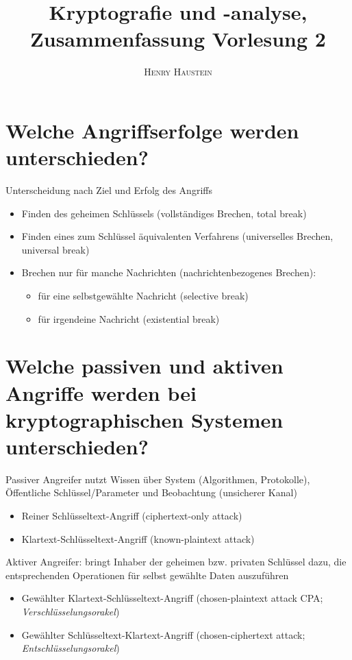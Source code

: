 \documentclass{article}
\title{\textbf{Kryptografie und -analyse, Zusammenfassung Vorlesung 2}}
\author{\textsc{Henry Haustein}}
\date{}
\begin{document}
	\maketitle
	
	\section*{Welche Angriffserfolge werden unterschieden?}
	Unterscheidung nach Ziel und Erfolg des Angriffs
	\begin{itemize}
		\item Finden des geheimen Schlüssels (vollständiges Brechen, total break)
		\item Finden eines zum Schlüssel äquivalenten Verfahrens (universelles Brechen, universal break)
		\item Brechen nur für manche Nachrichten (nachrichtenbezogenes Brechen):
		\begin{itemize}
			\item für eine selbstgewählte Nachricht (selective break)
			\item für irgendeine Nachricht (existential break)
		\end{itemize}
	\end{itemize}

	\section*{Welche passiven und aktiven Angriffe werden bei kryptographischen Systemen unterschieden?}
	Passiver Angreifer nutzt Wissen über System (Algorithmen, Protokolle), Öffentliche Schlüssel/Parameter und Beobachtung (unsicherer Kanal)
	\begin{itemize}
		\item Reiner Schlüsseltext-Angriff (ciphertext-only attack)
		\item Klartext-Schlüsseltext-Angriff (known-plaintext attack)
	\end{itemize}

	Aktiver Angreifer: bringt Inhaber der geheimen bzw. privaten Schlüssel dazu, die entsprechenden Operationen für selbst gewählte Daten auszuführen
	\begin{itemize}
		\item Gewählter Klartext-Schlüsseltext-Angriff (chosen-plaintext attack CPA; \textit{Verschlüsselungsorakel})
		\item Gewählter Schlüsseltext-Klartext-Angriff (chosen-ciphertext attack; \textit{Entschlüsselungsorakel})
	\end{itemize}
	
\end{document}
